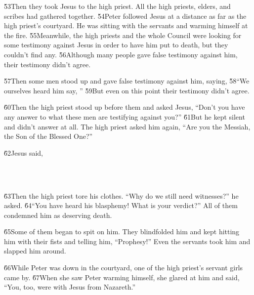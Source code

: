 \v{53}Then they took Jesus to the high priest. All the high priests, elders, and scribes had gathered together. \v{54}Peter followed Jesus at a distance as far as the high priest's courtyard. He was sitting with the servants and warming himself at the fire. \v{55}Meanwhile, the high priests and the whole Council were looking for some testimony against Jesus in order to have him put to death, but they couldn't find any. \v{56}Although many people gave false testimony against him, their testimony didn't agree.

\v{57}Then some men stood up and gave false testimony against him, saying, \v{58}``We ourselves heard him say, '' \v{59}But even on this point their testimony didn't agree.

\v{60}Then the high priest stood up before them and asked Jesus, ``Don't you have any answer to what these men are testifying against you?'' \v{61}But he kept silent and didn't answer at all. The high priest asked him again, ``Are you the Messiah, the Son of the Blessed One?''

\v{62}Jesus said, 

\begin{poetry}
\poeml {} \\
\poemll    {} \\
\poemlll       {}
\end{poetry}

\v{63}Then the high priest tore his clothes. ``Why do we still need witnesses?'' he asked. \v{64}``You have heard his blasphemy! What is your verdict?'' All of them condemned him as deserving death.

\v{65}Some of them began to spit on him. They blindfolded him and kept hitting him with their fists and telling him, ``Prophesy!'' Even the servants took him and slapped him around.

\v{66}While Peter was down in the courtyard, one of the high priest's servant girls came by. \v{67}When she saw Peter warming himself, she glared at him and said, ``You, too, were with Jesus from Nazareth.''

